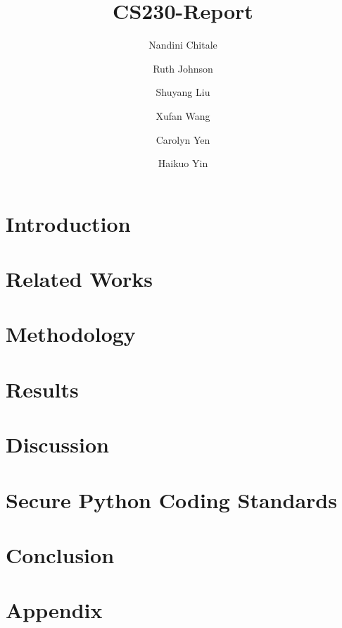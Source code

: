 \documentclass[acmlarge]{acmart}
\title{CS230-Report}
\author{Nandini Chitale}
\author{Ruth Johnson}
\author{Shuyang Liu}
\author{Xufan Wang}
\author{Carolyn Yen}
\author{Haikuo Yin}
\begin{document}
\maketitle

\begin{abstract}
    
\end{abstract}
\section{Introduction}

\section{Related Works}

\section{Methodology}

\section{Results}

\section{Discussion}

\section{Secure Python Coding Standards}

\section{Conclusion}

\section{Appendix}



\end{document}
